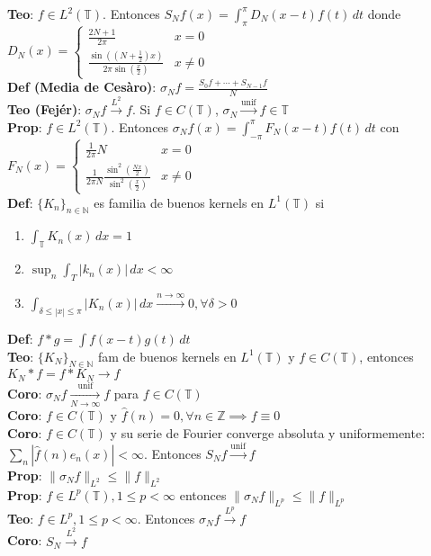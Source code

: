 \documentclass[9pt, letterpaper]{extarticle}
\newcommand{\N}{\mathbb{N}}
\newcommand{\Z}{\mathbb{Z}}
\newcommand{\T}{\mathbb{T}}
\begin{document}
\begin{multicols*}{2}
\textbf{Teo}: $f\in L^2(\T)$. Entonces $S_N f(x)=\int_\pi^\pi D_N(x-t)f(t)\,dt$ donde $D_N(x)=\begin{cases}
	\frac{2N+1}{2\pi}&x=0\\
	\frac{\sin((N+\frac{1}{2})x)}{2\pi \sin(\frac{x}{2})}&x\neq 0
\end{cases}$\\
\textbf{Def (Media de Cesàro)}: $\sigma_N f=\frac{S_0f+\cdots+S_{N-1}f}{N}$\\
\textbf{Teo (Fejér)}: $\sigma_Nf\xrightarrow{L^2}f$. Si $f\in C(\T)$, $\sigma_N\xrightarrow{\text{unif}}f\in \T$\\
\textbf{Prop}: $f\in L^2(\T)$. Entonces $\sigma_N f(x)=\int_{-\pi}^\pi F_N(x-t)f(t)\,dt$ con $F_N(x)=\begin{cases}
	\frac{1}{2\pi}N &x=0\\
	\frac{1}{2\pi N}\frac{\sin^2(\frac{Nx}{2})}{\sin^2(\frac{x}{2})}&x\neq 0
\end{cases}$\\
\textbf{Def}: $\{K_n\}_{n\in\N}$ es familia de buenos kernels en $L^1(\T)$ si \begin{enumerate}
	\item $\int_\T K_n(x)\,dx=1$
	\item $\sup_n\int_T|k_n(x)|\,dx<\infty$
	\item $\int_{\delta\leq |x|\leq \pi} |K_n(x)|\,dx\xrightarrow{n\to\infty}0,\forall\delta>0$
\end{enumerate}
\textbf{Def}: $f*g=\int f(x-t)g(t)\,dt$\\
\textbf{Teo}: $\{K_N\}_{N\in\N}$ fam de buenos kernels en $L^1(\T)$ y $f\in C(\T)$, entonces $K_N*f=f*K_N\to f$\\
\textbf{Coro}: $\sigma_N f\xrightarrow[N\to\infty]{\text{unif}} f$ para $f\in C(\T)$\\
\textbf{Coro}: $f\in C(\T)$ y $\hat f(n)=0,\forall n\in\Z\implies f\equiv 0$\\
\textbf{Coro}: $f\in C(\T)$ y su serie de Fourier converge absoluta y uniformemente: $\sum_n |\hat f(n)e_n(x)|<\infty$. Entonces $S_N f\xrightarrow{\text{unif}} f$\\
\textbf{Prop}: $\|\sigma_N f\|_{L^2}\leq \|f\|_{L^2}$\\
\textbf{Prop}: $f\in L^p(\T), 1\leq p<\infty$ entonces $\|\sigma_N f\|_{L^p}\leq \|f\|_{L^p}$\\
\textbf{Teo}: $f\in L^p, 1\leq p<\infty$. Entonces $\sigma_N f\xrightarrow{L^p} f$\\
\textbf{Coro}: $S_N\xrightarrow{L^2} f$\\

\end{multicols*}
\end{document}
